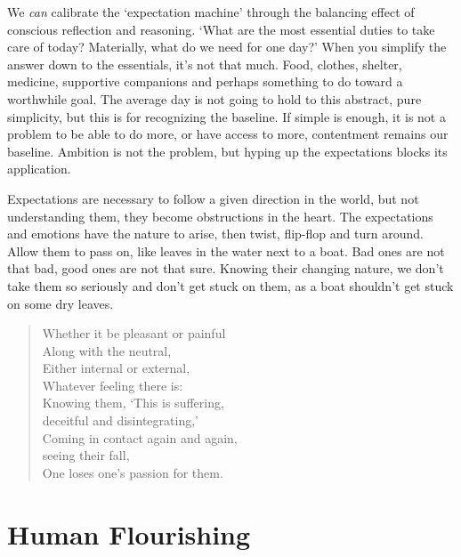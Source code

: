 
We \emph{can} calibrate the `expectation machine' through the balancing
effect of conscious reflection and reasoning. `What are the most
essential duties to take care of today? Materially, what do we need for
one day?' When you simplify the answer down to the essentials, it's not
that much. Food, clothes, shelter, medicine, supportive companions and
perhaps something to do toward a worthwhile goal. The average day is not
going to hold to this abstract, pure simplicity, but this is for
recognizing the baseline. If simple is enough, it is not a problem to be
able to do more, or have access to more, contentment remains our
baseline. Ambition is not the problem, but hyping up the expectations
blocks its application.

Expectations are necessary to follow a given direction in the world, but
not understanding them, they become obstructions in the heart. The
expectations and emotions have the nature to arise, then twist,
flip-flop and turn around. Allow them to pass on, like leaves in the
water next to a boat. Bad ones are not that bad, good ones are not that
sure. Knowing their changing nature, we don't take them so seriously and
don't get stuck on them, as a boat shouldn't get stuck on some dry
leaves.

\begin{quote}
Whether it be pleasant or painful\\
Along with the neutral,\\
Either internal or external,\\
Whatever feeling there is:\\
Knowing them, `This is suffering,\\
deceitful and disintegrating,'\\
Coming in contact again and again,\\
seeing their fall,\\
One loses one's passion for them.

\bigskip

\end{quote}

\clearpage

\section{Human Flourishing}

